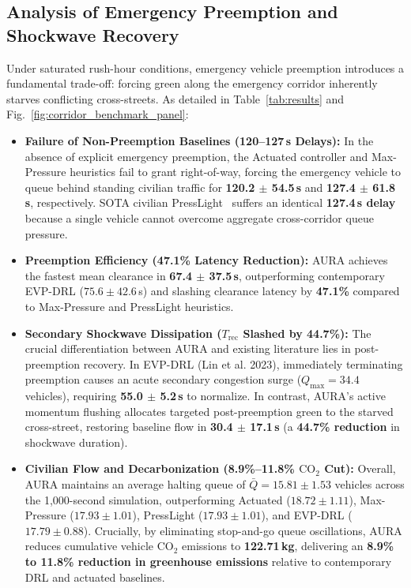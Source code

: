\subsection{Analysis of Emergency Preemption and Shockwave Recovery}
Under saturated rush-hour conditions, emergency vehicle preemption introduces a fundamental trade-off: forcing green along the emergency corridor inherently starves conflicting cross-streets. As detailed in Table~\ref{tab:results} and Fig.~\ref{fig:corridor_benchmark_panel}:
\begin{itemize}
    \item \textbf{Failure of Non-Preemption Baselines (120--127\,s Delays):} In the absence of explicit emergency preemption, the Actuated controller and Max-Pressure heuristics fail to grant right-of-way, forcing the emergency vehicle to queue behind standing civilian traffic for \textbf{120.2 $\pm$ 54.5\,s} and \textbf{127.4 $\pm$ 61.8\,s}, respectively. SOTA civilian PressLight~\cite{wei2019presslight} suffers an identical \textbf{127.4\,s delay} because a single vehicle cannot overcome aggregate cross-corridor queue pressure.
    \item \textbf{Preemption Efficiency (47.1\% Latency Reduction):} AURA achieves the fastest mean clearance in \textbf{67.4 $\pm$ 37.5\,s}, outperforming contemporary EVP-DRL ($75.6 \pm 42.6$\,s) and slashing clearance latency by \textbf{47.1\%} compared to Max-Pressure and PressLight heuristics.
    \item \textbf{Secondary Shockwave Dissipation ($T_{\text{rec}}$ Slashed by 44.7\%):} The crucial differentiation between AURA and existing literature lies in post-preemption recovery. In EVP-DRL (Lin et al. 2023), immediately terminating preemption causes an acute secondary congestion surge ($Q_{\max} = 34.4$ vehicles), requiring \textbf{55.0 $\pm$ 5.2\,s} to normalize. In contrast, AURA's active momentum flushing allocates targeted post-preemption green to the starved cross-street, restoring baseline flow in \textbf{30.4 $\pm$ 17.1\,s} (a \textbf{44.7\% reduction} in shockwave duration).
    \item \textbf{Civilian Flow and Decarbonization (8.9\%--11.8\% $\text{CO}_2$ Cut):} Overall, AURA maintains an average halting queue of $\bar{Q} = \mathbf{15.81 \pm 1.53}$ vehicles across the 1,000-second simulation, outperforming Actuated ($18.72 \pm 1.11$), Max-Pressure ($17.93 \pm 1.01$), PressLight ($17.93 \pm 1.01$), and EVP-DRL ($17.79 \pm 0.88$). Crucially, by eliminating stop-and-go queue oscillations, AURA reduces cumulative vehicle $\text{CO}_2$ emissions to \textbf{122.71\,kg}, delivering an \textbf{8.9\% to 11.8\% reduction in greenhouse emissions} relative to contemporary DRL and actuated baselines.
\end{itemize}

